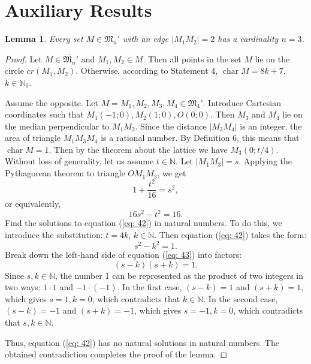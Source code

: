 \documentclass[a4paper,14pt]{article} %
\theoremstyle{plain}
\newtheorem{lemma}[theorem]{Lemma}
\theoremstyle{definition}
\begin{document}
\section{Auxiliary Results}

\begin{lemma}
	\label{lem:no_distance_2}
	Every set $M \in \overline{\mathfrak{M}_n}'$ with an edge $|M_1M_2|=2$ has a cardinality $n=3$.
\end{lemma}


\begin{proof}
	Let $M \in \overline{\mathfrak{M}_n}'$ and $M_1, M_2 \in M$. Then all points in the set $M$ lie on the circle $cr(M_1, M_2)$. Otherwise, according to Statement 4, $\operatorname{char}{M}={8k+7}$, $k\in \mathbb{N}_0$.

	Assume the opposite. Let $M={M_1, M_2, M_3, M_4} \in \overline{\mathfrak{M}_4}'$. Introduce Cartesian coordinates such that $M_1(-1;0), M_2(1;0), O(0;0)$. Then $M_3$ and $M_4$ lie on the median perpendicular to $M_1M_2$. Since the distance $|M_3M_4|$ is an integer, the area of triangle $M_1M_3M_4$ is a rational number. By Definition 6, this means that $\operatorname{char}{M}={1}$. Then by the theorem about the lattice we have $M_3(0;t/4)$. Without loss of generality, let us assume $t\in\mathbb{N}$. Let $|M_1M_3|=s$. Applying the Pythagorean theorem to triangle $OM_1M_3$, we get
	$$
	1+\frac{t^2}{16}=s^2,
	$$
	or equivalently,
	\begin{equation}
	\label{eq: 42}
	16s^2-t^2=16.
	\end{equation}
	Find the solutions to equation (\ref{eq: 42}) in natural numbers. To do this, we introduce the substitution: $t=4k$, $k\in\mathbb{N}$. Then equation (\ref{eq: 42}) takes the form:
	\begin{equation}
	\label{eq: 43}
	s^2-k^2=1.
	\end{equation}
	Break down the left-hand side of equation (\ref{eq: 43}) into factors:
	\begin{equation}
	\label{eq: 44}
	(s-k)(s+k)=1.
	\end{equation}
	Since $s,k\in\mathbb{N}$, the number 1 can be represented as the product of two integers in two ways: $1\cdot1$ and $-1\cdot(-1)$. In the first case, $(s-k)=1$ and $(s+k)=1$, which gives $s=1,k=0$, which contradicts that $k\in\mathbb{N}$.
	In the second case, $(s-k)=-1$ and $(s+k)=-1$, which gives $s=-1,k=0$, which contradicts that $s,k\in\mathbb{N}$.

	Thus, equation (\ref{eq: 42}) has no natural solutions in natural numbers.
	The obtained contradiction completes the proof of the lemma.
\end{proof}
\end{document}
